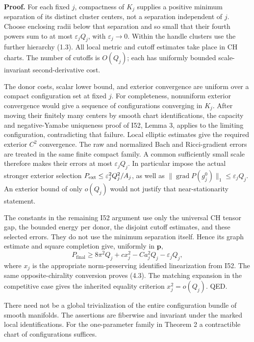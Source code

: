 \documentclass[
  11pt,
]{article}
\begin{document}
\textbf{Proof.} For each fixed \(j\), compactness of \(K_j\) supplies a
positive minimum separation of its distinct cluster centers, not a
separation independent of \(j\). Choose enclosing radii below that
separation and so small that their fourth powers sum to at most
\(\varepsilon_jQ_j\), with \(\varepsilon_j\to0\). Within the handle
clusters use the further hierarchy (1.3). All local metric and cutoff
estimates take place in CH charts. The number of cutoffs is \(O(Q_j)\);
each has uniformly bounded scale-invariant second-derivative cost.

The donor costs, scalar lower bound, and exterior convergence are
uniform over a compact configuration set at fixed \(j\). For
completeness, nonuniform exterior convergence would give a sequence of
configurations converging in \(K_j\). After moving their finitely many
centers by smooth chart identifications, the capacity and
negative-Yamabe uniqueness proof of I52, Lemma 3, applies to the
limiting configuration, contradicting that failure. Local elliptic
estimates give the required exterior \(C^2\) convergence. The raw and
normalized Bach and Ricci-gradient errors are treated in the same finite
compact family. A common sufficiently small scale therefore makes their
errors at most \(\varepsilon_jQ_j\). In particular impose the actual
stronger exterior selection \(P_{\rm ext}\le\varepsilon_j^2Q_j^2/A_j\),
as well as \(\|\operatorname{grad}P(g_j^0)\|_1\le\varepsilon_jQ_j\). An
exterior bound of only \(o(Q_j)\) would not justify that
near-stationarity statement.

The constants in the remaining I52 argument use only the universal CH
tensor gap, the bounded energy per donor, the disjoint cutoff estimates,
and these selected errors. They do not use the minimum separation
itself. Hence its graph estimate and square completion give, uniformly
in \(\mathbf p\), \[
 P_{\mathrm{final}}\ge8\pi^2Q_j+c x_j^2
                         -C a_j^2Q_j-\varepsilon_jQ_j,        \tag{4.4}
\] where \(x_j\) is the appropriate norm-preserving identified
linearization from I52. The same opposite-chirality conversion proves
(4.3). The matching expansion in the competitive case gives the
inherited equality criterion \(x_j^2=o(Q_j)\). QED.

There need not be a global trivialization of the entire configuration
bundle of smooth manifolds. The assertions are fiberwise and invariant
under the marked local identifications. For the one-parameter family in
Theorem 2 a contractible chart of configurations suffices.
\end{document}
